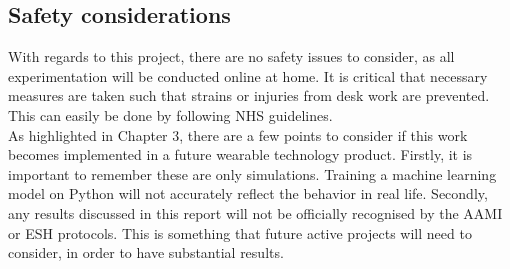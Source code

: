 \subsection{Safety considerations}
With regards to this project, there are no safety issues to consider, as all experimentation 
will be conducted online at home. It is critical that necessary measures are taken such 
that strains or injuries from desk work are prevented. This can easily be done by following 
NHS guidelines. \\ \newline \noindent As highlighted in Chapter 3, there are a 
few points to consider if this work becomes implemented in a future wearable 
technology product. Firstly, it is important to remember these are only simulations. 
Training a machine learning model on Python will not accurately reflect the behavior 
in real life. Secondly, any results discussed in this report will not be officially 
recognised by the AAMI or ESH protocols. This is something that future active projects 
will need to consider, in order to have substantial results.